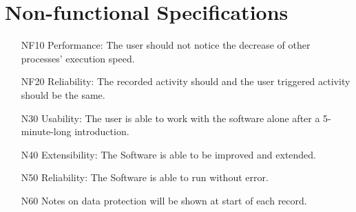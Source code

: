 \chapter{Non-functional Specifications}
\label{ch:nonfunc}
\begin{itemize}
    \item[NF10] Performance: The user should not notice the decrease of other processes' execution speed.
    \item[NF20] Reliability: The recorded activity should and the user triggered activity should be the same.
    \item[N30]  Usability: The user is able to work with the software alone after a 5-minute-long introduction.
    \item[N40] Extensibility: The Software is able to be improved and extended.
    \item[N50] Reliability: The Software is able to run without error. %
    \item[N60] Notes on data protection will be shown at start of each record. %
    
\end{itemize}